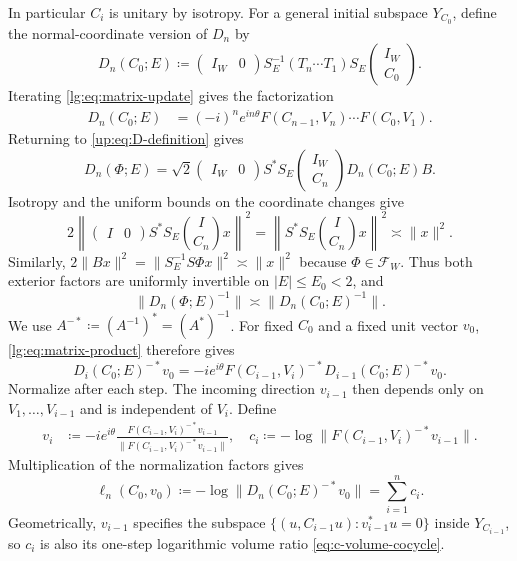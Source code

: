 \documentclass[11pt]{article}
\numberwithin{equation}{section}
\theoremstyle{remark}
\newcommand{\C}{\mathbb C}
\begin{document}
In particular $C_i$ is unitary by isotropy.
For a general initial subspace $Y_{C_0}$, define the normal-coordinate
version of $D_n$ by
\begin{equation}\label{lg:eq:normal-transfer}
 D_n( {C_0};E)\coloneqq
 \begin{pmatrix}I_W&0\end{pmatrix}
 S_E^{-1}(T_n\cdots T_1)S_E\begin{pmatrix}I_W\\C_0\end{pmatrix}.
\end{equation}
Iterating \eqref{lg:eq:matrix-update} gives the
factorization
\begin{equation}\label{lg:eq:matrix-product}
 \begin{aligned}
 D_n(C_0;E)&=(-i)^ne^{in\theta}F(C_{n-1},V_n)\cdots F(C_0,V_1).
 \end{aligned}
\end{equation}
Returning to \eqref{up:eq:D-definition} gives
\[
 D_n(\Phi;E)=
 \sqrt2\begin{pmatrix}I_W&0\end{pmatrix}S^*S_E
 \begin{pmatrix}I_W\\C_n\end{pmatrix}D_n(C_0;E)B.
\]
Isotropy and the uniform bounds on the coordinate changes give
\[
 2\left\|\begin{pmatrix}I&0\end{pmatrix}S^*S_E
       \binom{I}{C_n}x\right\|^2
 =\left\|S^*S_E\binom{I}{C_n}x\right\|^2\asymp\|x\|^2.
\]
Similarly, $2\|Bx\|^2=\|S_E^{-1}S\Phi x\|^2\asymp\|x\|^2$
because $\Phi\in\mathcal F_W$. Thus both exterior factors are uniformly
invertible on $|E|\le E_0<2$, and
\begin{equation}\label{lg:eq:coordinate-comparison}
 \|D_n(\Phi;E)^{-1}\|
 \asymp\|D_n(C_0;E)^{-1}\|.
\end{equation}
We use $A^{-*}\coloneqq(A^{-1})^*=(A^*)^{-1}$.
For fixed $C_0$ and a fixed unit vector $v_0$,
\eqref{lg:eq:matrix-product} therefore gives
\[
 D_i(C_0;E)^{-*}v_0
 =-ie^{i\theta}F(C_{i-1},V_i)^{-*}D_{i-1}(C_0;E)^{-*}v_0.
\]
Normalize after each step. The incoming direction $v_{i-1}$ then depends
only on $V_1,\ldots,V_{i-1}$ and is independent of $V_i$. Define
\begin{equation}\label{lg:eq:update}
 \begin{aligned}
 v_i&\coloneqq-ie^{i\theta}
 \frac{F(C_{i-1},V_i)^{-*}v_{i-1}}
      {\|F(C_{i-1},V_i)^{-*}v_{i-1}\|},\quad
 c_i\coloneqq-\log\|F(C_{i-1},V_i)^{-*}v_{i-1}\|.
 \end{aligned}
\end{equation}
Multiplication of the normalization factors gives
\begin{equation}\label{lg:eq:additive-growth}
 \ell_n(C_0,v_0)\coloneqq-\log\|D_n(C_0;E)^{-*}v_0\|
 =\sum_{i=1}^n c_i.
\end{equation}
Geometrically, $v_{i-1}$ specifies the subspace
$\{(u,C_{i-1}u):v_{i-1}^*u=0\}$ inside $Y_{C_{i-1}}$, so $c_i$ is also its one-step
logarithmic volume ratio \eqref{eq:c-volume-cocycle}.
\end{document}
